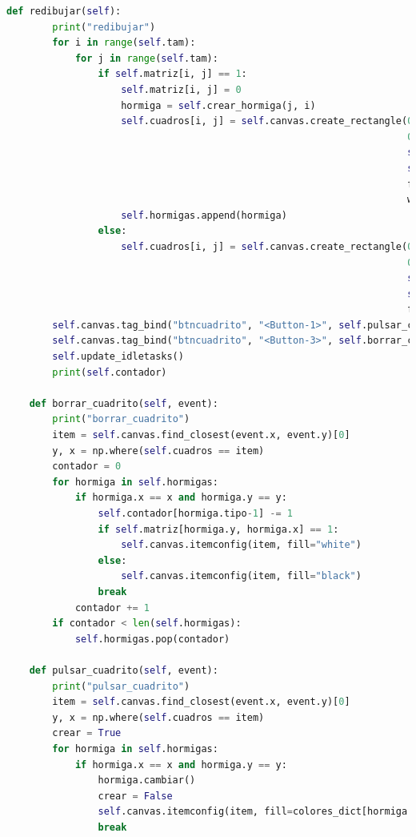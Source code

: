 \begin{lstlisting}[language=Python]
    def redibujar(self):
        print("redibujar")
        for i in range(self.tam):
            for j in range(self.tam):
                if self.matriz[i, j] == 1:
                    self.matriz[i, j] = 0
                    hormiga = self.crear_hormiga(j, i)
                    self.cuadros[i, j] = self.canvas.create_rectangle(0 + (j * self.tam_cuadro),
                                                                      0 + (i * self.tam_cuadro),
                                                                      self.tam_cuadro + (j * self.tam_cuadro),
                                                                      self.tam_cuadro + (i * self.tam_cuadro),
                                                                      fill=hormiga.color,
                                                                      width=0, tag="btncuadrito")
                    self.hormigas.append(hormiga)
                else:
                    self.cuadros[i, j] = self.canvas.create_rectangle(0 + (j * self.tam_cuadro),
                                                                      0 + (i * self.tam_cuadro),
                                                                      self.tam_cuadro + (j * self.tam_cuadro),
                                                                      self.tam_cuadro + (i * self.tam_cuadro),
                                                                      fill="black", width=0, tag="btncuadrito")
        self.canvas.tag_bind("btncuadrito", "<Button-1>", self.pulsar_cuadrito)
        self.canvas.tag_bind("btncuadrito", "<Button-3>", self.borrar_cuadrito)
        self.update_idletasks()
        print(self.contador)

    def borrar_cuadrito(self, event):
        print("borrar_cuadrito")
        item = self.canvas.find_closest(event.x, event.y)[0]
        y, x = np.where(self.cuadros == item)
        contador = 0
        for hormiga in self.hormigas:
            if hormiga.x == x and hormiga.y == y:
                self.contador[hormiga.tipo-1] -= 1
                if self.matriz[hormiga.y, hormiga.x] == 1:
                    self.canvas.itemconfig(item, fill="white")
                else:
                    self.canvas.itemconfig(item, fill="black")
                break
            contador += 1
        if contador < len(self.hormigas):
            self.hormigas.pop(contador)

    def pulsar_cuadrito(self, event):
        print("pulsar_cuadrito")
        item = self.canvas.find_closest(event.x, event.y)[0]
        y, x = np.where(self.cuadros == item)
        crear = True
        for hormiga in self.hormigas:
            if hormiga.x == x and hormiga.y == y:
                hormiga.cambiar()
                crear = False
                self.canvas.itemconfig(item, fill=colores_dict[hormiga.orientacion])
                break


\end{lstlisting}
